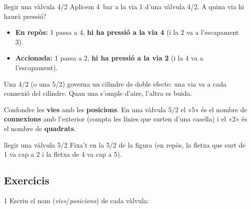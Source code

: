 \begin{exemple}{llegir una vàlvula 4/2}
Aplicem \SI{4}{\bar} a la via 1 d'una vàlvula 4/2. A quina via hi haurà pressió?
\begin{itemize}
 \item \textbf{En repòs:} 1 passa a 4, \textbf{hi ha pressió a la via 4} (i la 2 va a l'escapament 3).
 \item \textbf{Accionada:} 1 passa a 2, \textbf{hi ha pressió a la via 2} (i la 4 va a l'escapament).
\end{itemize}
Una 4/2 (o una 5/2) governa un cilindre de doble efecte: una via va a cada connexió del cilindre. Quan una s'omple d'aire, l'altra es buida.
\end{exemple}

\begin{atencio}
Confondre les \textbf{vies} amb les \textbf{posicions}. En una vàlvula 5/2 el «5» és el nombre de \textbf{connexions} amb l'exterior (compta les línies que surten d'una casella) i el «2» és el nombre de \textbf{quadrats}.
\end{atencio}

\begin{guiada}{llegir una vàlvula 5/2}
Fixa't en la 5/2 de la figura (en repòs, la fletxa que surt de 1 va cap a 2 i la fletxa de 4 va cap a 5).
\end{guiada}

\subsection*{Exercicis}

\begin{exercici}{1}
Escriu el nom (\emph{vies}/\emph{posicions}) de cada vàlvula:\\[0.4em]
\begin{center}
\end{center}
\end{exercici}

